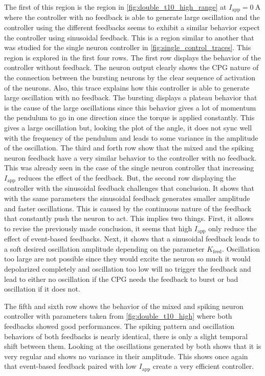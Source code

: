 The first of this region is the region in \cref{fig:double_t10_high_range} at $I_\text{app} = \qty{0}{\ampere}$ where the controller with no feedback is able to generate large oscillation and the controller using the different feedbacks seems to exhibit a similar behavior expect the controller using sinusoidal feedback.
This is a region similar to another that was studied for the single neuron controller in \cref{fig:single_control_traces}. 
This region is explored in the first four rows.
The first row displays the behavior of the controller without feedback.
The neuron output clearly shows the CPG nature of the connection between the bursting neurons by the clear sequence of activation of the neurons. 
Also, this trace explains how this controller is able to generate large oscillation with no feedback.
The bursting displays a plateau behavior that is the cause of the large oscillations since this behavior gives a lot of momentum the pendulum to go in one direction since the torque is applied constantly.
This gives a large oscillation but, looking  the plot of the angle, it does not sync well with the frequency of the pendulum and leads to some variance in the amplitude of the oscillation.
The third and forth row show that the mixed and the spiking neuron feedback have a very similar behavior to the controller with no feedback.
This was already seen in the case of the single neuron controller that increasing $I_\text{app}$ reduces the effect of the feedback. 
But, the second row displaying the controller with the sinusoidal feedback challenges that conclusion. 
It shows that with the same parameters the sinusoidal feedback generates smaller amplitude and faster oscillations. 
This is caused by the continuous nature of the feedback that constantly push the neuron to act.
This implies two things. 
First, it allows to revise the previously made conclusion, it seems that high $I_\text{app}$ only reduce the effect of event-based feedbacks.
Next, it shows that a  sinusoidal feedback leads to a soft desired oscillation amplitude depending on the parameter $K_\text{feed}$.
Oscillation too large are not possible since they would excite the neuron so much it would depolarized completely and oscillation too low will no trigger the feedback and lead to either no oscillation if the CPG needs the feedback to burst or bad oscillation if it does not.

The fifth and sixth row shows the behavior of the mixed and spiking neuron controller with parameters taken from \cref{fig:double_t10_high} where both feedbacks showed good performances.
The spiking pattern and oscillation behaviors of both feedbacks is nearly identical, there is only a slight temporal shift between them.
Looking at the oscillations generated by both shows that it is very regular and shows no variance in their amplitude.
This shows once again that event-based feedback paired with low $I_\text{app}$ create a very efficient controller.

